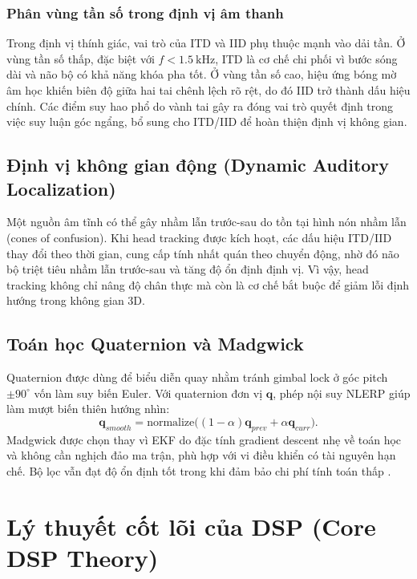 \subsection{Phân vùng tần số trong định vị âm thanh}
Trong định vị thính giác, vai trò của ITD và IID phụ thuộc mạnh vào dải tần. Ở vùng tần số thấp, đặc biệt với $f < \SI{1.5}{\kilo\hertz}$, ITD là cơ chế chi phối vì bước sóng dài và não bộ có khả năng khóa pha tốt. Ở vùng tần số cao, hiệu ứng bóng mờ âm học khiến biên độ giữa hai tai chênh lệch rõ rệt, do đó IID trở thành dấu hiệu chính. Các điểm suy hao phổ do vành tai gây ra đóng vai trò quyết định trong việc suy luận góc ngẩng, bổ sung cho ITD/IID để hoàn thiện định vị không gian.

\section{Định vị không gian động (Dynamic Auditory Localization)}
Một nguồn âm tĩnh có thể gây nhầm lẫn trước-sau do tồn tại hình nón nhầm lẫn (cones of confusion). Khi head tracking được kích hoạt, các dấu hiệu ITD/IID thay đổi theo thời gian, cung cấp tính nhất quán theo chuyển động, nhờ đó não bộ triệt tiêu nhầm lẫn trước-sau và tăng độ ổn định định vị. Vì vậy, head tracking không chỉ nâng độ chân thực mà còn là cơ chế bắt buộc để giảm lỗi định hướng trong không gian 3D.

\section{Toán học Quaternion và Madgwick}
Quaternion được dùng để biểu diễn quay nhằm tránh gimbal lock ở góc pitch $\pm 90^{\circ}$ vốn làm suy biến Euler. Với quaternion đơn vị $\mathbf{q}$, phép nội suy NLERP giúp làm mượt biến thiên hướng nhìn:
\begin{equation}
    \mathbf{q}_{smooth} = \text{normalize}\big((1-\alpha)\mathbf{q}_{prev} + \alpha\mathbf{q}_{curr}\big).
\end{equation}
Madgwick được chọn thay vì EKF do đặc tính gradient descent nhẹ về toán học và không cần nghịch đảo ma trận, phù hợp với vi điều khiển có tài nguyên hạn chế. Bộ lọc vẫn đạt độ ổn định tốt trong khi đảm bảo chi phí tính toán thấp \cite{madgwick2011}.

\chapter{Lý thuyết cốt lõi của DSP (Core DSP Theory)}

